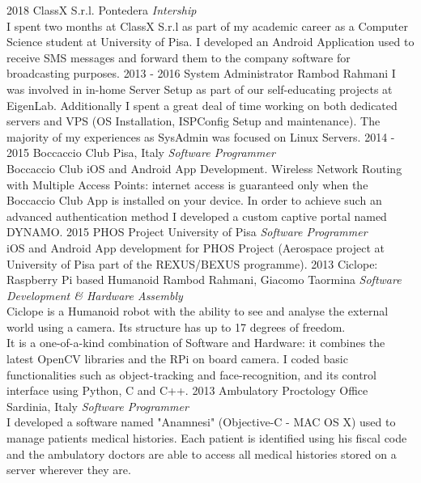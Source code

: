 \documentclass[]{friggeri-cv} %
\begin{document}
\begin{entrylist}
\entry
{2018}
{ClassX S.r.l.}
{Pontedera}
{\emph{Intership} \\
I spent two months at ClassX S.r.l as part of my academic career as a Computer Science student at University of Pisa. I developed an Android Application used to receive SMS messages and forward them to the company software for broadcasting purposes.}
\entry
{2013 - 2016}
{System Administrator}
{Rambod Rahmani}
{I was involved in in-home Server Setup as part of our self-educating projects at EigenLab. Additionally I spent a great deal of time working on both dedicated servers and VPS (OS Installation, ISPConfig Setup and maintenance). The majority of my experiences as SysAdmin was focused on Linux Servers.}
\entry
{2014 - 2015}
{Boccaccio Club}
{Pisa, Italy}
{\emph{Software Programmer} \\
Boccaccio Club iOS and Android App Development. Wireless Network Routing with Multiple Access Points: internet access is guaranteed only when the Boccaccio Club App is installed on your device. In order to achieve such an advanced authentication method I developed a custom captive portal named DYNAMO.}
\entry
{2015}
{PHOS Project}
{University of Pisa}
{\emph{Software Programmer} \\
iOS and Android App development for PHOS Project (Aerospace project at University of Pisa part of the REXUS/BEXUS programme).}
\entry
{2013}
{Ciclope: Raspberry Pi based Humanoid}
{Rambod Rahmani, Giacomo Taormina}
{\emph{Software Development \& Hardware Assembly} \\
Ciclope is a Humanoid robot with the ability to see and analyse the external world using a camera. Its structure has up to 17 degrees of freedom.\\
It is a one-of-a-kind combination of Software and Hardware: it combines the latest OpenCV libraries and the RPi on board camera. I coded basic functionalities such as object-tracking and face-recognition, and its control interface using Python, C and C++.}
\entry
{2013}
{Ambulatory Proctology Office}
{Sardinia, Italy}
{\emph{Software Programmer} \\
I developed a software named "Anamnesi" (Objective-C - MAC OS X) used to manage patients medical histories. Each patient is identified using his fiscal code and the ambulatory doctors are able to access all medical histories stored on a server wherever they are.}

\end{entrylist}
\end{document}

